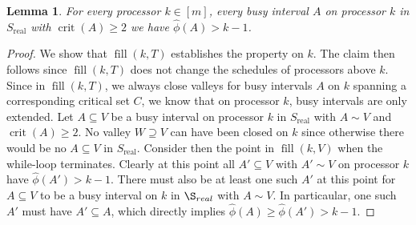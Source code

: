 \documentclass[a4paper]{article}
\DeclareMathOperator{\real}{real}
\DeclareMathOperator{\crit}{crit}
\DeclareMathOperator{\fillop}{fill}
\newtheorem{lemma}[theorem]{Lemma}
\begin{document}
\begin{lemma}\label{lemma:phi_prop}
  For every processor $k \in [m]$, every busy interval $A$ on processor $k$ in $S_{\real}$ with $\crit(A) \geq 2$ we have $\hat \phi(A) > k - 1$.
\end{lemma}
\begin{proof}
  We show that $\fillop(k, T)$ establishes the property on $k$.
  The claim then follows since $\fillop(k, T)$ does not change the schedules of processors above $k$.
  Since in $\fillop(k, T)$, we always close valleys for busy intervals $A$ on $k$ spanning a corresponding critical set $C$, we know that on processor $k$, busy intervals are only extended.
  Let $A \subseteq V$ be a busy interval on processor $k$ in $S_{\real}$ with $A \sim V$ and $\crit(A) \geq 2$.
  No valley $W \supseteq V$ can have been closed on $k$ since otherwise there would be no $A \subseteq V$ in $S_{\real}$.
  Consider then the point in $\fillop(k, V)$ when the while-loop terminates.
  Clearly at this point all $A' \subseteq V$ with $A' \sim V$ on processor $k$ have $\hat \phi(A') > k - 1$.
  There must also be at least one such $A'$ at this point for $A \subseteq V$ to be a busy interval on $k$ in $\S_{real}$ with $A \sim V$.
  In particaular, one such $A'$ must have $A' \subseteq A$, which directly implies $\hat \phi(A) \geq \hat \phi(A') > k - 1$.
\end{proof}
\end{document}
